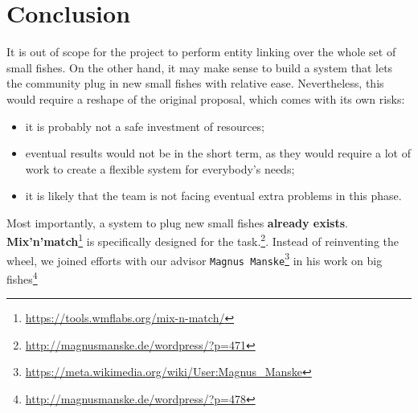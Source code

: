 \section{Conclusion}
\label{cha:24}
It is out of scope for the project to perform entity linking over the whole set of small fishes. On the other hand, it may make sense to build a system that lets the community plug in new small fishes with relative ease. Nevertheless, this would require a reshape of the original proposal, which comes with its own risks:
\begin{itemize}
\item it is probably not a safe investment of resources;
\item eventual results would not be in the short term, as they would require a lot of work to create a flexible system for everybody's needs;
\item it is likely that the team is not facing eventual extra problems in this phase.
\end{itemize}

Most importantly, a system to plug new small fishes \textbf{already exists}. \textbf{Mix'n'match}\footnote{\url{https://tools.wmflabs.org/mix-n-match/}} is specifically designed for the task.\footnote{\url{http://magnusmanske.de/wordpress/?p=471}}. Instead of reinventing the wheel, we joined efforts with our advisor \texttt{Magnus Manske}\footnote{\url{https://meta.wikimedia.org/wiki/User:Magnus_Manske}} in his work on big fishes\footnote{\url{http://magnusmanske.de/wordpress/?p=478}}

